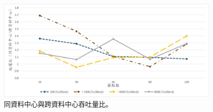 \begin{figure}[h]
\centering
\includegraphics[scale=0.8]{images/65.jpg}
\caption{同資料中心與跨資料中心吞吐量比。}
\label{i:byz-latency}
\end{figure}
